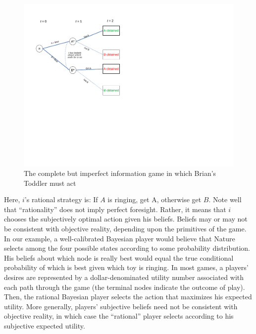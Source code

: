 \documentclass[
11pt,
titlepage,
reqno,
]{article}%
\theoremstyle{definition}
\begin{document}
\begin{figure}[h!]
	\centering
	\includegraphics*[page=22,trim = 0 0in 0in 0in,scale=.65]{Awareness_Diagrams_All}
	\caption{The complete but imperfect information game in which Brian's Toddler must act\label{Diag: p-22}}%
\end{figure}

Here, $i$'s  rational strategy is: If $A$ is ringing, get A, otherwise get $B$. Note well that ``rationality'' does not imply perfect foresight. Rather, it means that $i$ chooses the subjectively optimal action given his beliefs. Beliefs may or may not be consistent with objective reality, depending upon the primitives of the game. In our example, a well-calibrated Bayesian player would believe that Nature selects among the four possible states according to some probability distribution. His beliefs about which node is really best would equal the true conditional probability of which is best given which toy is ringing. In most games, a players' desires are represented by a dollar-denominated utility number associated with each path through the game (the terminal nodes indicate the outcome of play). Then, the rational Bayesian player selects the action that maximizes his expected utility. More generally, players' subjective beliefs need not be consistent with objective reality, in which case the ``rational'' player selects according to his subjective expected utility.
\end{document}

